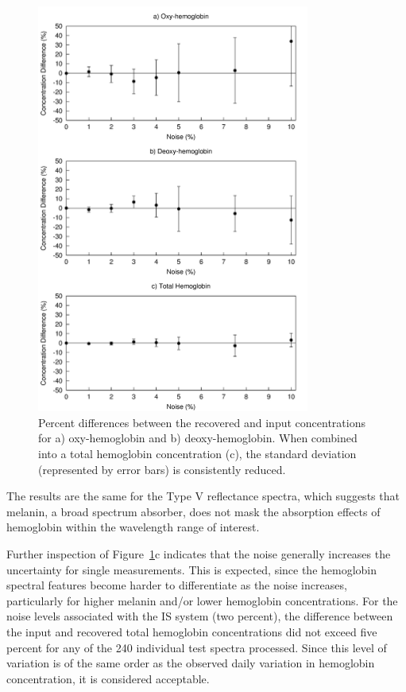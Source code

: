 \begin{figure}
	\centering \includegraphics[width=0.8\textwidth]{figures/p3-noise_effect_mod.png}
	\caption[Percent differences between the recovered and input hemoglobin concentrations]{\label{fig:p3-oxy_deoxy_total}Percent differences between the recovered and input concentrations for a) oxy-hemoglobin and b) deoxy-hemoglobin. When combined into a total hemoglobin concentration (c), the standard deviation (represented by error bars) is consistently reduced.}
\end{figure}

The results are the same for the Type V reflectance spectra, which suggests that melanin, a broad spectrum absorber, does not mask the absorption effects of hemoglobin within the wavelength range of interest.

Further inspection of Figure~\ref{fig:p3-oxy_deoxy_total}c indicates that the noise generally increases the uncertainty for single measurements. This is expected, since the hemoglobin spectral features become harder to differentiate as the noise increases, particularly for higher melanin and/or lower hemoglobin concentrations. For the noise levels associated with the IS system (two percent), the difference between the input and recovered total hemoglobin concentrations did not exceed five percent for any of the 240 individual test spectra processed. Since this level of variation is of the same order as the observed daily variation in hemoglobin concentration,\cite{Fullerton1996} it is considered acceptable.

